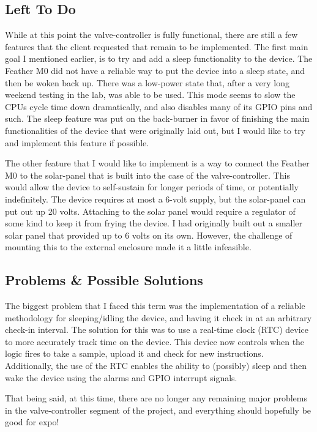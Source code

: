 \documentclass[onecolumn, draftclsnofoot,10pt, compsoc]{IEEEtran}
\begin{document}
\subsection{Left To Do}%
While at this point the valve-controller is fully functional, there are still a few features that the client requested that remain to be implemented.
The first main goal I mentioned earlier, is to try and add a sleep functionality to the device.
The Feather M0 did not have a reliable way to put the device into a sleep state, and then be woken back up.
There was a low-power state that, after a very long weekend testing in the lab, was able to be used.
This mode seems to slow the CPUs cycle time down dramatically, and also disables many of its GPIO pins and such.
The sleep feature was put on the back-burner in favor of finishing the main functionalities of the device that were originally laid out, but I would like to try and implement this feature if possible.

The other feature that I would like to implement is a way to connect the Feather M0 to the solar-panel that is built into the case of the valve-controller.
This would allow the device to self-sustain for longer periods of time, or potentially indefinitely.
The device requires at most a 6-volt supply, but the solar-panel can put out up 20 volts.
Attaching to the solar panel would require a regulator of some kind to keep it from frying the device.
I had originally built out a smaller solar panel that provided up to 6 volts on its own.
However, the challenge of mounting this to the external enclosure made it a little infeasible.


\subsection{Problems \& Possible Solutions}%
The biggest problem that I faced this term was the implementation of a reliable methodology for sleeping/idling the device, and having it check in at an arbitrary check-in interval.
The solution for this was to use a real-time clock (RTC) device to more accurately track time on the device.
This device now controls when the logic fires to take a sample, upload it and check for new instructions.
Additionally, the use of the RTC enables the ability to (possibly) sleep and then wake the device using the alarms and GPIO interrupt signals.

That being said, at this time, there are no longer any remaining major problems in the valve-controller segment of the project, and everything should hopefully be good for expo!
\end{document}
